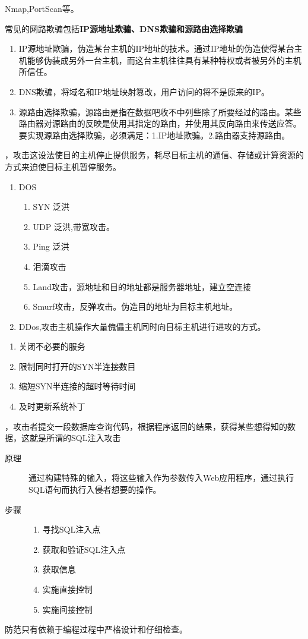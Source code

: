 Nmap,PortScan等。

 常见的网路欺骗包括\textbf{IP源地址欺骗、DNS欺骗和源路由选择欺骗}
\begin{enumerate}
	\item IP源地址欺骗，伪造某台主机的IP地址的技术。通过IP地址的伪造使得某台主机能够伪装成另外一台主机，而这台主机往往具有某种特权或者被另外的主机所信任。
	\item DNS欺骗，将域名和IP地址映射篡改，用户访问的将不是原来的IP。
	\item 源路由选择欺骗，源路由是指在数据吧收不中列些除了所要经过的路由。某些路由器对源路由的反映是使用其指定的路由，并使用其反向路由来传送应答。要实现源路由选择欺骗，必须满足：1.IP地址欺骗。2.路由器支持源路由。
\end{enumerate}

，攻击这设法使目的主机停止提供服务，耗尽目标主机的通信、存储或计算资源的方式来迫使目标主机暂停服务。
\begin{enumerate}
	\item DOS
	\begin{enumerate}
		\item SYN 泛洪
		\item UDP 泛洪,带宽攻击。
		\item Ping 泛洪
		\item 泪滴攻击
		\item Land攻击，源地址和目的地址都是服务器地址，建立空连接
		\item Smurf攻击，反弹攻击。伪造目的地址为目标主机地址。
	\end{enumerate}
	\item DDos,攻击主机操作大量傀儡主机同时向目标主机进行进攻的方式。
\end{enumerate}

\begin{enumerate}
	\item 关闭不必要的服务
	\item 限制同时打开的SYN半连接数目
	\item 缩短SYN半连接的超时等待时间
	\item 及时更新系统补丁
\end{enumerate}


，攻击者提交一段数据库查询代码，根据程序返回的结果，获得某些想得知的数据，这就是所谓的SQL注入攻击
\begin{description}
	\item[原理] 通过构建特殊的输入，将这些输入作为参数传入Web应用程序，通过执行SQL语句而执行入侵者想要的操作。
	\item[步骤] 
	\begin{enumerate}
		\item 寻找SQL注入点
		\item 获取和验证SQL注入点
		\item 获取信息
		\item 实施直接控制
		\item 实施间接控制
	\end{enumerate}
\end{description}
防范只有依赖于编程过程中严格设计和仔细检查。

